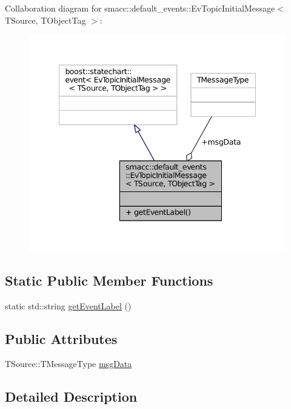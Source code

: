 Collaboration diagram for smacc\+:\+:default\+\_\+events\+:\+:Ev\+Topic\+Initial\+Message$<$ T\+Source, T\+Object\+Tag $>$\+:
\nopagebreak
\begin{figure}[H]
\begin{center}
\leavevmode
\includegraphics[width=342pt]{structsmacc_1_1default__events_1_1EvTopicInitialMessage__coll__graph}
\end{center}
\end{figure}
\subsection*{Static Public Member Functions}
\begin{DoxyCompactItemize}
\item 
static std\+::string \hyperlink{structsmacc_1_1default__events_1_1EvTopicInitialMessage_a7532e8ca89792c94c46074076e59d265}{get\+Event\+Label} ()
\end{DoxyCompactItemize}
\subsection*{Public Attributes}
\begin{DoxyCompactItemize}
\item 
T\+Source\+::\+T\+Message\+Type \hyperlink{structsmacc_1_1default__events_1_1EvTopicInitialMessage_a989c7cf4210c7750806b081bc73112cd}{msg\+Data}
\end{DoxyCompactItemize}


\subsection{Detailed Description}
